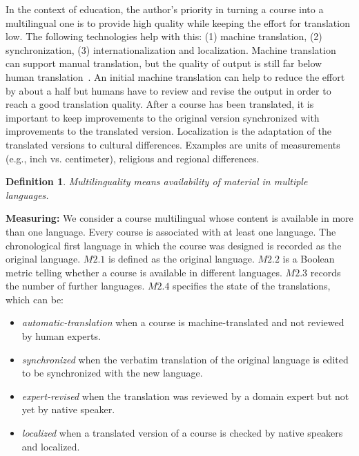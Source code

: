 \documentclass{sig-alternate}
\theoremstyle{definition}
\newtheorem{defn}{Definition}
\begin{document}
In the context of education, the author's priority in turning a course into a multilingual one is to provide high quality while keeping the effort for translation low.
The following technologies help with this: (1) machine translation, (2) synchronization,
(3) internationalization and localization.
Machine translation can support manual translation, but the quality of output is still far below human translation~\parencite{Green.2013}.
An initial machine translation can help to reduce the effort by about a half but humans have to review and revise the output in order to reach a good translation quality.
After a course has been translated, it is important to keep improvements to the original version synchronized with improvements to the translated version.
Localization is the adaptation of the translated versions to cultural differences.
Examples are units of measurements (e.g., inch vs. centimeter), religious and regional differences.

\begin{defn}
\emph {Multilinguality means availability of material in multiple languages.}
\end{defn}

\noindent\textbf{Measuring:}
We consider a course multilingual whose content is available in more than one language.
Every course is associated with at least one language.
The chronological first language in which the course was designed is recorded as the original language.
$M2.1$ is defined as the original language.
$M2.2$ is a Boolean metric telling whether a course is available in different languages.
$M2.3$ records the number of further languages.
$M2.4$ specifies the state of the translations, which can be:
\begin{itemize}
\item \emph{automatic-translation} when a course is machine-translated and not reviewed by human experts.
\item \emph{synchronized} when the verbatim translation of the original language is edited to be synchronized with the new language.
\item \emph{expert-revised} when the translation was reviewed by a domain expert but not yet by native speaker.
\item \emph{localized} when a translated version of a course is checked by native speakers and localized.
\end{itemize}
\end{document}

